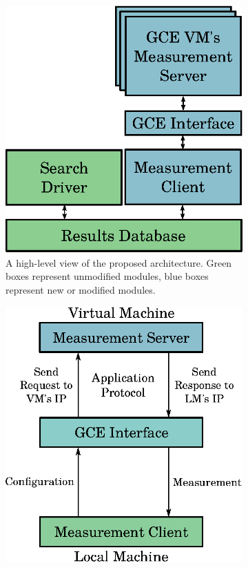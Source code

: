 \documentclass[a4paper, 12pt]{article}
\begin{document}
\begin{figure}[htpb]
    \centering
    \begin{subfigure}{.45\textwidth}
        \centering
        \includegraphics[scale=.62]{high-level-implementation}
        \caption{A high-level view of the proposed architecture.
        Green boxes represent unmodified modules, blue boxes represent
        new or modified modules.}
        \label{fig:high-level}
    \end{subfigure}%
    \hfill
    \begin{subfigure}{.45\textwidth}
        \centering
        \includegraphics[scale=.62]{low-level-implementation}

\end{subfigure}
\end{figure}
\end{document}
